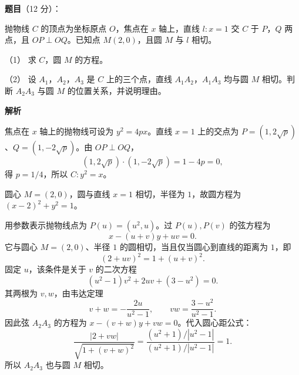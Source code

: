 \begin{answer}

\textbf{题目}（12 分）：

抛物线 $C$ 的顶点为坐标原点 $O$，焦点在 $x$ 轴上，直线 $l:x=1$ 交 $C$ 于 $P$，$Q$ 两点，且 $OP\perp OQ$。已知点 $M(2,0)$，且圆 $M$ 与 $l$ 相切。

（1） 求 $C$，圆 $M$ 的方程。

（2） 设 $A_1$，$A_2$，$A_3$ 是 $C$ 上的三个点，直线 $A_1A_2$，$A_1A_3$ 均与圆 $M$ 相切。判断 $A_2A_3$ 与圆 $M$ 的位置关系，并说明理由。

\textbf{解析}


焦点在 $x$ 轴上的抛物线可设为 $y^2=4px$。直线 $x=1$ 上的交点为 $P=(1,2\sqrt p)$、$Q=(1,-2\sqrt p)$。由 $OP\perp OQ$，
\nopagebreak[4]
\[
(1,2\sqrt p)\cdot(1,-2\sqrt p)=1-4p=0,
\]
得 $p=1/4$，所以 $C:y^2=x$。

圆心 $M=(2,0)$，圆与直线 $x=1$ 相切，半径为 $1$，故圆方程为 $(x-2)^2+y^2=1$。


用参数表示抛物线点为 $P(u)=(u^2,u)$。过 $P(u),P(v)$ 的弦方程为
\nopagebreak[4]
\[
x-(u+v)y+uv=0.
\]
它与圆心 $M=(2,0)$、半径 $1$ 的圆相切，当且仅当圆心到直线的距离为 $1$，即
\nopagebreak[4]
\[
(2+uv)^2=1+(u+v)^2.
\]
固定 $u$，该条件是关于 $v$ 的二次方程
\nopagebreak[4]
\[
(u^2-1)v^2+2uv+(3-u^2)=0.
\]
其两根为 $v,w$，由韦达定理
\nopagebreak[4]
\[
v+w=-\frac{2u}{u^2-1},\qquad vw=\frac{3-u^2}{u^2-1}.
\]
因此弦 $A_2A_3$ 的方程为 $x-(v+w)y+vw=0$。代入圆心距公式：
\nopagebreak[4]
\[
\frac{|2+vw|}{\sqrt{1+(v+w)^2}}
=\frac{(u^2+1)/|u^2-1|}{(u^2+1)/|u^2-1|}=1.
\]
所以 $A_2A_3$ 也与圆 $M$ 相切。



\end{answer}
